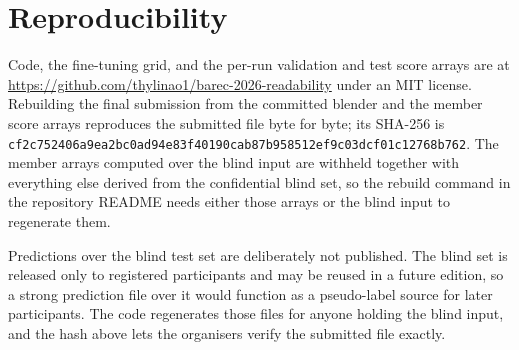 \section{Reproducibility}
\label{app:repro}

Code, the fine-tuning grid, and the per-run validation and test score arrays are at
\url{https://github.com/thylinao1/barec-2026-readability} under an MIT license. Rebuilding the
final submission from the committed blender and the member score arrays reproduces the
submitted file byte for byte; its SHA-256 is
\texttt{cf2c752406a9ea2b\allowbreak c0ad94e83f40190c\allowbreak ab87b958512ef9c0\allowbreak 3dcf01c12768b762}. The
member arrays computed over the blind input are withheld together with everything else
derived from the confidential blind set, so the rebuild command in the repository README
needs either those arrays or the blind input to regenerate them.

Predictions over the blind test set are deliberately not published. The blind set is
released only to registered participants and may be reused in a future edition, so a strong
prediction file over it would function as a pseudo-label source for later participants. The
code regenerates those files for anyone holding the blind input, and the hash above lets the
organisers verify the submitted file exactly.
